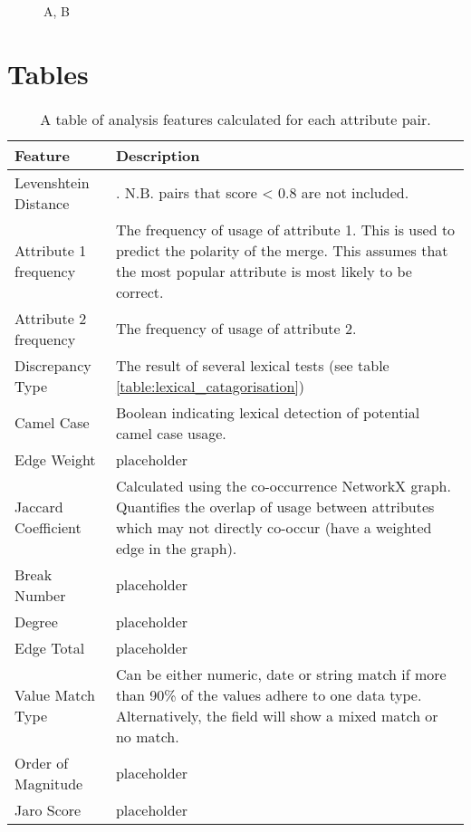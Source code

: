 \documentclass{bmcart}
\begin{document}
\begin{backmatter}
  \begin{figure}[h!]
  \caption{ A, B}
\label{fig:frequency}
\end{figure}



\section*{Tables}
\begin{table}[h!]
\caption{A table of analysis features calculated for each attribute pair.}
      \begin{tabular}{|p{3cm}|p{10cm}|}
        \hline
           Feature & Description  \\ \hline
           Levenshtein Distance &  \cite{levenshtein1966binary}. N.B. pairs that score < 0.8 are not included. \\
           Attribute 1 frequency & The frequency of usage of attribute 1. This is used to predict the polarity of the merge. This assumes that the most popular attribute is most likely to be correct. \\
           Attribute 2 frequency & The frequency of usage of attribute 2.  \\
           Discrepancy Type & The result of several lexical tests (see table \ref{table:lexical_catagorisation}) \\
           Camel Case & Boolean indicating lexical detection of potential camel case usage. \\
           Edge Weight & placeholder \\
           Jaccard Coefficient \cite{jaccard1901distribution} & Calculated using the co-occurrence NetworkX graph. Quantifies the overlap of usage between attributes which may not directly co-occur (have a weighted edge in the graph). \\
           Break Number & placeholder \\
           Degree & placeholder \\
           Edge Total & placeholder \\
           Value Match Type & Can be either numeric, date or string match if more than 90\% of the values adhere to one data type. Alternatively, the field will show a mixed match or no match. \\
           Order of Magnitude & placeholder \\
           Jaro Score & placeholder \\ \hline
      \end{tabular}
\label{table:features}
\end{table}


\end{backmatter}
\end{document}
